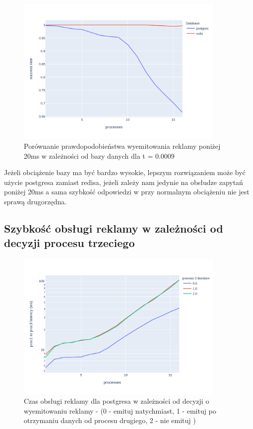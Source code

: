 \documentclass[polish, 10pt]{article}
\begin{document}
\begin{figure}[H]
    \centering
    \includegraphics[width=0.9\textwidth]{./graphs/success_rate_postgres_vs_redis_0009.png}
    \caption{Porównanie prawdopodobieństwa wyemitowania reklamy poniżej 20ms w zależności od bazy danych dla t = 0.0009}
\end{figure}

Jeżeli obciążenie bazy ma być bardzo wysokie, lepszym rozwiązaniem może być użycie postgresa zamiast redisa, jeżeli zależy nam jedynie na obsłudze zapytań poniżej 20ms a sama szybkość odpowiedzi w przy normalnym obciążeniu nie jest sprawą drugorzędna.

\subsection{Szybkość obsługi reklamy w zależności od decyzji procesu trzeciego}

\begin{figure}[H]
    \centering
    \includegraphics[width=0.9\textwidth]{./graphs/proc_type_postgres.png}
    \caption{Czas obsługi reklamy dla postgresa w zależności od decyzji o wyemitowaniu reklamy - (0 - emituj natychmiast, 1 - emituj po otrzymaniu danych od procesu drugiego, 2 - nie emituj )}
\end{figure}
\end{document}
